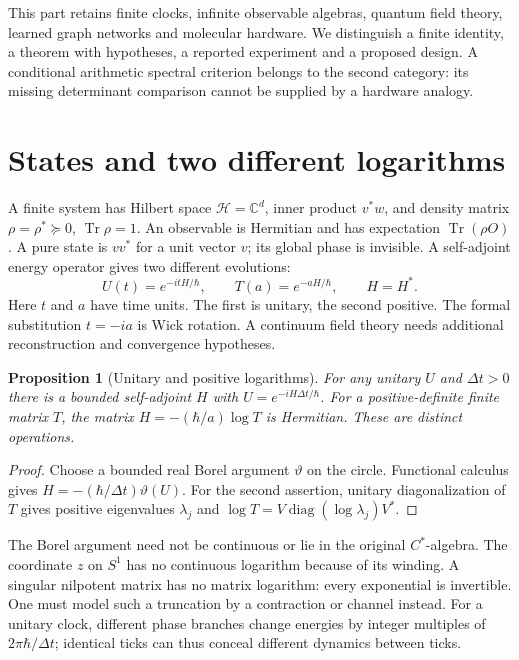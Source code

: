 \documentclass[11pt,oneside,openany]{book}
\newtheorem{proposition}[theorem]{Proposition}
\theoremstyle{definition}\newtheorem{definition}[theorem]{Definition}
\theoremstyle{remark}\newtheorem{remark}[theorem]{Remark}
\newcommand{\C}{\mathbb C}\newcommand{\Z}{\mathbb Z}\newcommand{\R}{\mathbb R}
\begin{document}
This part retains finite clocks, infinite observable algebras, quantum field
theory, learned graph networks and molecular hardware. We distinguish a
finite identity, a theorem with hypotheses, a reported experiment and a
proposed design. A conditional arithmetic spectral criterion belongs to the
second category: its missing determinant comparison cannot be supplied by
a hardware analogy.

\section{States and two different logarithms}
A finite system has Hilbert space $\mathcal H=\C^d$, inner product $v^*w$,
and density matrix $\rho=\rho^*\succeq0$, $\operatorname{Tr}\rho=1$.
An observable is Hermitian and has expectation $\operatorname{Tr}(\rho O)$.
A pure state is $vv^*$ for a unit vector $v$; its global phase is invisible.
A self-adjoint energy operator gives two different evolutions:
\begin{equation}\label{phys:evolutions}
 U(t)=e^{-itH/\hbar},\qquad T(a)=e^{-aH/\hbar},\qquad H=H^*.
\end{equation}
Here $t$ and $a$ have time units. The first is unitary, the second positive.
The formal substitution $t=-ia$ is Wick rotation. A continuum field theory
needs additional reconstruction and convergence hypotheses.

\begin{proposition}[Unitary and positive logarithms]\label{phys:logs}
For any unitary $U$ and $\Delta t>0$ there is a bounded self-adjoint $H$
with $U=e^{-iH\Delta t/\hbar}$. For a positive-definite finite matrix $T$,
the matrix $H=-(\hbar/a)\log T$ is Hermitian. These are distinct operations.
\end{proposition}
\begin{proof}
Choose a bounded real Borel argument $\vartheta$ on the circle. Functional
calculus gives $H=-(\hbar/\Delta t)\vartheta(U)$. For the second assertion,
unitary diagonalization of $T$ gives positive eigenvalues $\lambda_j$ and
$\log T=V\operatorname{diag}(\log\lambda_j)V^*$.
\end{proof}
The Borel argument need not be continuous or lie in the original
$C^*$-algebra. The coordinate $z$ on $S^1$ has no continuous logarithm
because of its winding. A singular nilpotent matrix has no matrix logarithm:
every exponential is invertible. One must model such a truncation by a
contraction or channel instead. For a unitary clock, different phase branches
change energies by integer multiples of $2\pi\hbar/\Delta t$; identical
ticks can thus conceal different dynamics between ticks.
\end{document}
